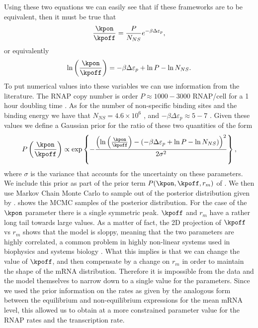 Using these two equations we can easily see that if these frameworks are to be
equivalent, then it must be true that
\begin{equation}
  {\kpon \over \kpoff} = {P \over N_{NS}} e^{-\beta\Delta\varepsilon_p},
\end{equation}
or equivalently
\begin{equation}
  \ln \left({\kpon \over \kpoff}\right) =
  -\beta\Delta\varepsilon_p + \ln P - \ln N_{NS}.
\end{equation}
To put numerical values into these variables we can use information from the
literature. The RNAP copy number is order $P \approx 1000-3000$
RNAP/cell for a 1 hour doubling time \cite{Klumpp2008}. As for the number of
non-specific binding sites and the binding energy we have that $N_{NS} =
4.6\times 10^6$ \cite{Bintu2005a}, and $-\beta\Delta\varepsilon_p \approx 5 - 7$
\cite{Brewster2012}. Given these values we define a Gaussian prior for the ratio
of these two quantities of the form
\begin{equation}
  P\left({\kpon \over \kpoff} \right) \propto
  \exp \left\{ - {\left(\ln \left({\kpon \over \kpoff}\right) -
  \left(-\beta\Delta\varepsilon_p + \ln P - \ln N_{NS} \right) \right)^2
  \over 2 \sigma^2} \right\},
\end{equation}
where $\sigma$ is the variance that accounts for the uncertainty on these
parameters. We include this prior as part of the prior term $P(\kpon, \kpoff,
r_m)$ of . We then use Markov Chain Monte Carlo to sample
out of the posterior distribution given by .
 shows the MCMC samples of the posterior distribution. For
the case of the $\kpon$ parameter there is a single symmetric peak. $\kpoff$ and
$r_m$ have a rather long tail towards large values. As a matter of fact, the 2D
projection of $\kpoff$ vs $r_m$ shows that the model is sloppy, meaning that the
two parameters are highly correlated, a common problem in highly non-linear
systems used in biophysics and systems biology \cite{Transtrum2015}. What this
implies is that we can change the value of $\kpoff$, and then compensate by a
change on $r_m$ in order to maintain the shape of the mRNA distribution.
Therefore it is impossible from the data and the model themselves to narrow down
to a single value for the parameters. Since we used the prior information on the
rates as given by the analogous form between the equilibrium and non-equilibrium
expressions for the mean mRNA level, this allowed us to obtain at a more
constrained parameter value for the RNAP rates and the transcription rate.

